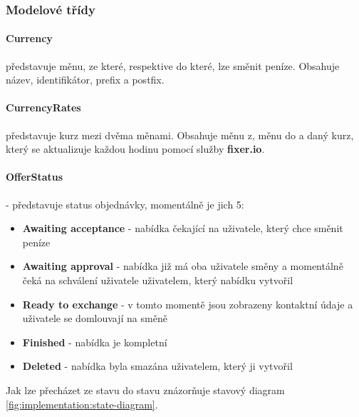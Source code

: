 \subsubsection{Modelové třídy}

\paragraph*{Currency} představuje měnu, ze které, respektive do které, lze směnit peníze. Obsahuje název, identifikátor, prefix a postfix.
\paragraph*{CurrencyRates} představuje kurz mezi dvěma měnami. Obsahuje měnu z, měnu do a daný kurz, který se aktualizuje každou hodinu pomocí služby \textbf{fixer.io}.
\paragraph*{OfferStatus} - představuje status objednávky, momentálně je jich 5:
\begin{itemize}
    \item \textbf{Awaiting acceptance} - nabídka čekající na uživatele, který chce směnit peníze
    \item \textbf{Awaiting approval} - nabídka již má oba uživatele směny a momentálně čeká na schválení uživatele uživatelem, který nabídku vytvořil
    \item \textbf{Ready to exchange} - v tomto momentě jsou zobrazeny kontaktní údaje a uživatele se domlouvají na směně
    \item \textbf{Finished} - nabídka je kompletní
    \item \textbf{Deleted} - nabídka byla smazána uživatelem, který ji vytvořil
\end{itemize}

Jak lze přecházet ze stavu do stavu znázorňuje stavový diagram \ref{fig:implementation:state-diagram}.

